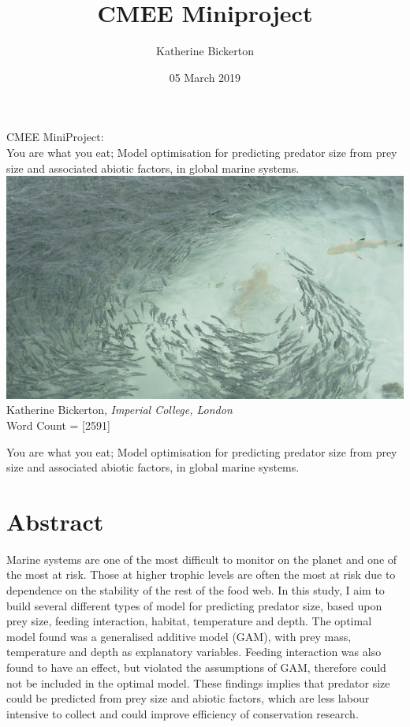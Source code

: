 \documentclass[11pt,a4paper]{article}
\title{CMEE Miniproject}
\date{05 March 2019}
\author{Katherine Bickerton}
\begin{document}
	
	\begin{titlepage}
		\centering
		{\Large
			\vskip4cm
			CMEE MiniProject:~\\
			\vskip1cm
			You are what you eat; Model optimisation for predicting predator size from prey size and associated abiotic factors, in global marine systems.
		}    
		\vskip2cm	
		\includegraphics[width = 15cm]{predprey.jpg}
		\vskip2cm	
		Katherine Bickerton, \textit{Imperial College, London}\\
		\vskip1cm		
		Word Count = [2591]
		\vspace*{\fill}
		\vspace*{\fill}
	\end{titlepage}
	
	
	\Large \noindent You are what you eat; Model optimisation for predicting predator size from prey size and associated abiotic factors, in global marine systems.
	\linenumbers
	
	\normalsize	
	\section{Abstract}
	
	\par \noindent Marine systems are one of the most difficult to monitor on the planet and one of the most at risk. Those at higher trophic levels are often the most at risk due to dependence on the stability of the rest of the food web. In this study, I aim to build several different types of model for predicting predator size, based upon prey size, feeding interaction, habitat, temperature and depth. The optimal model found was a generalised additive model (GAM), with prey mass, temperature and depth as explanatory variables. Feeding interaction was also found to have an effect, but violated the assumptions of GAM, therefore could not be included in the optimal model. These findings implies that predator size could be predicted from prey size and abiotic factors, which are less labour intensive to collect and could improve efficiency of conservation research.
	
\end{document}
